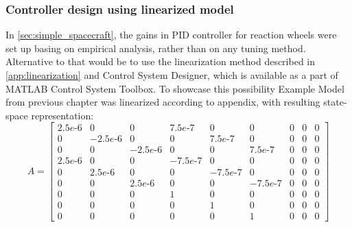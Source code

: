     \subsubsection{Controller design using linearized model}\label{sec:control_design}
        In \autoref{sec:simple_spacecraft}, the gains in PID controller for reaction wheels were set up basing on empirical analysis, rather than on any tuning method. Alternative to that would be to use the linearization method described in \autoref{app:linearization} and Control System Designer, which is available as a part of MATLAB Control System Toolbox. To showcase this possibility Example Model from previous chapter was linearized according to appendix, with resulting state-space representation:
        \small
        \begin{equation}
            A =
            \begin{bmatrix}
                2.5e \text{-}6 &            0 &            0 &      7.5e \text{-}7  &           0  &           0            & 0            & 0           &  0 \\
                      0 &     -2.5e \text{-}6 &            0 &            0  &     7.5e \text{-}7  &           0            & 0            & 0           &  0 \\
                      0 &            0 &     -2.5e \text{-}6 &            0  &           0  &     7.5e \text{-}7            & 0            & 0           &  0 \\
                2.5e \text{-}6 &            0 &            0 &     -7.5e \text{-}7  &           0  &           0            & 0            & 0           &  0 \\
                      0 &      2.5e \text{-}6 &            0 &            0  &    -7.5e \text{-}7  &           0            & 0            & 0           &  0 \\
                      0 &            0 &      2.5e \text{-}6 &            0  &           0  &    -7.5e \text{-}7            & 0            & 0           &  0 \\
                      0 &            0 &            0 &            1  &           0  &           0            & 0            & 0           &  0 \\
                      0 &            0 &            0 &            0  &           1  &           0            & 0            & 0           &  0 \\
                      0 &            0 &            0 &            0  &           0  &           1            & 0            & 0           &  0 
            \end{bmatrix}
        \end{equation}
        \normalsize
        
